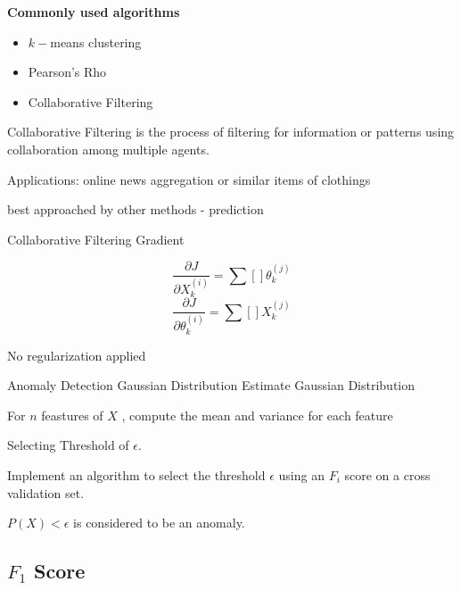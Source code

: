 \documentclass[11pt]{article} %
\begin{document}
\textbf{Commonly used algorithms}
\begin{itemize}
	\item $k-$means clustering
	\item Pearson's Rho
	\item Collaborative Filtering
\end{itemize}

Collaborative Filtering is the process of filtering for information or patterns using collaboration among multiple
agents.

Applications: online news aggregation or similar items of clothings

best approached by other methods - prediction

Collaborative Filtering Gradient

\[ \frac{\partial J}{\partial X^{(i)}_k}  = \sum [  ] \theta^{(j)}_k \]
\[ \frac{\partial J}{\partial \theta^{(i)}_k}  = \sum [  ] X^{(j)}_k \]

No regularization applied

Anomaly Detection
Gaussian Distribution
Estimate Gaussian Distribution

For $n$ feastures of $X$ , compute the mean and variance for each feature

Selecting Threshold of $\epsilon$.

Implement an algorithm to select the threshold $\epsilon$ using an $F_i$ score on a 
cross validation set.

$P(X) < \epsilon$ is considered to be an anomaly.

\subsection{$F_1$ Score}
\end{document}
